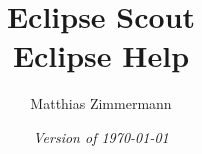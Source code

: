 
\author{Matthias Zimmermann}
\title{
\Huge\bf Eclipse Scout\\
\huge Eclipse Help
}
\ifpdf
  \isodate
\fi
\date{\emph{Version of \today}}
\maketitle

